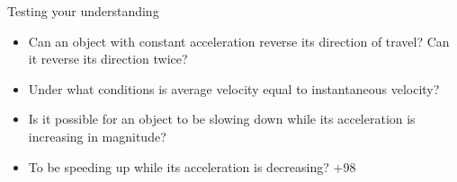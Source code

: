 \documentclass[]{beamer}
\begin{document}

 \begin{frame}
  Testing your understanding
  \vspace{3mm}
\begin{itemize}
   \item Can an object with constant acceleration reverse its direction
   of travel? Can it reverse its direction twice?
   \item Under what conditions is average velocity equal to instantaneous
   velocity?
   \item Is it possible for an object to be slowing down while its
   acceleration is increasing in magnitude?
   \item  To be speeding up
   while its acceleration is decreasing? +98
\end{itemize}

 
  
  
   \end{frame}















 
\end{document}
